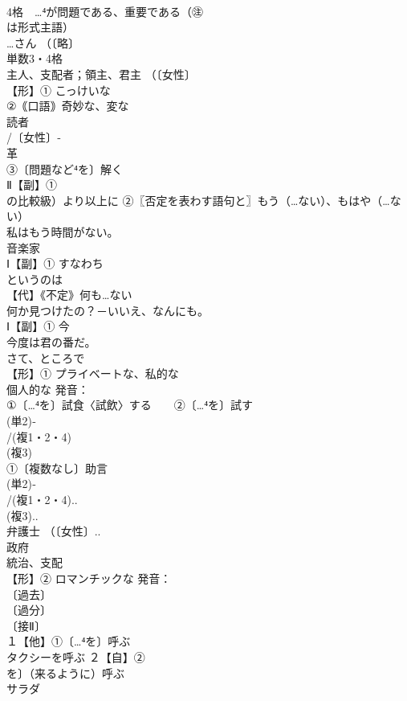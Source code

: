 \documentclass[8pt]{extreport}
\begin{document}
\begin{CJK}{UTF8}{min}
\\	4格　…⁴が問題である、重要である（㊟
\\	は形式主語）
\\	…さん （〔略〕
\\	単数3・4格
\\	主人、支配者；領主、君主 （〔女性〕
\\	【形】① こっけいな 
\\	②｟口語｠奇妙な、変な
\\	読者 
\\	/〔女性〕‐
\\	革
\\	③〔問題など⁴を〕解く
\\	Ⅱ【副】①
\\	の比較級）より以上に ②〖否定を表わす語句と〗もう（…ない）、もはや（…ない）
\\	私はもう時間がない。
\\	音楽家 
\\	Ⅰ【副】① すなわち　
\\	というのは
\\	【代】《不定》何も…ない 
\\	何か見つけたの？－いいえ、なんにも。
\\	Ⅰ【副】① 今 
\\	今度は君の番だ。 
\\	さて、ところで
\\	【形】① プライベートな、私的な 
\\	個人的な 発音：
\\	①〔…⁴を〕試食〈試飲〉する　　②〔…⁴を〕試す
\\	(単2)‐
\\	/(複1・2・4)
\\	(複3)
\\	①〔複数なし〕助言 
\\	(単2)‐
\\	/(複1・2・4)..
\\	(複3)..
\\	弁護士 （〔女性〕..
\\	政府 
\\	統治、支配
\\	【形】② ロマンチックな 発音：
\\	〔過去〕
\\	〔過分〕
\\	〔接Ⅱ〕
\\	１【他】①〔…⁴を〕呼ぶ 
\\	タクシーを呼ぶ ２【自】②
\\	を〕（来るように）呼ぶ
\\	サラダ 

\end{CJK}
\end{document}
